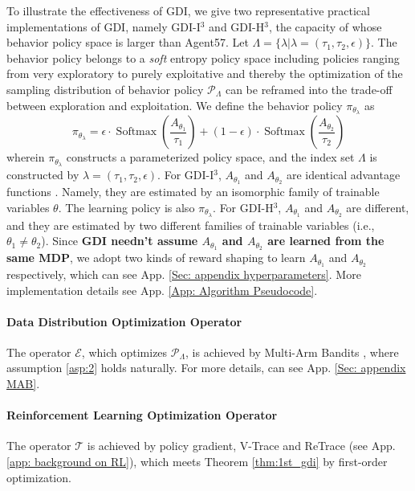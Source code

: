 To illustrate the effectiveness of GDI, we give two representative practical implementations of GDI, namely GDI-I$^3$ and GDI-H$^3$, the capacity of whose behavior policy space is larger than Agent57.  Let $\Lambda = \{\lambda | \lambda = (\tau_1, \tau_2, \epsilon)\}$.
The behavior policy belongs to a \emph{soft} entropy policy space including policies ranging from very exploratory to purely exploitative and thereby the optimization of the sampling distribution  of behavior policy $\mathcal{P}_{\Lambda}$ can be reframed into the trade-off between exploration and exploitation.
We define the behavior policy $\pi_{\theta_{\lambda}}$ as
\begin{equation}
\label{equ: soft epsilon policy space}
    \pi_{\theta_{\lambda}}=\epsilon \cdot \operatorname{Softmax}\left(\frac{A_{\theta_1}}{\tau_{1}}\right)+(1-\epsilon) \cdot \operatorname{Softmax}\left(\frac{A_{\theta_2}}{\tau_{2}}\right)
\end{equation}
wherein $\pi_{\theta_{\lambda}}$ constructs a parameterized policy space, and the index set $\Lambda$ is constructed by $\lambda = (\tau_1, \tau_2, \epsilon)$.
For GDI-I$^3$, $A_{\theta_1}$ and $A_{\theta_2}$ are identical advantage functions \citep{dueling_q}. Namely, they are estimated by an isomorphic family of trainable variables $\theta$.
The learning policy is also $\pi_{\theta_{\lambda}}$.
For GDI-H$^3$,  $A_{\theta_1}$ and $A_{\theta_2}$ are different, and they are estimated by two different families of trainable variables (i.e., $\theta_1 \neq \theta_2$).
Since \textbf{GDI needn't assume $A_{\theta_1}$ and $A_{\theta_2}$ are learned from the same MDP}, we adopt two kinds of reward shaping to learn $A_{\theta_1}$ and $A_{\theta_2}$ respectively, which  can see App. \ref{Sec: appendix hyperparameters}.
More implementation details see App. \ref{App: Algorithm Pseudocode}.

\paragraph{Data Distribution Optimization Operator} The operator $\mathcal{E}$, which optimizes $\mathcal{P}_{\Lambda}$,  is achieved by Multi-Arm Bandits \citep[MAB]{sutton}, 
where assumption \eqref{asp:2} holds naturally.
For more details, can see App. \ref{Sec: appendix MAB}. 


\paragraph{Reinforcement Learning  Optimization Operator}  The operator $\mathcal{T}$ is achieved by policy gradient, V-Trace and ReTrace \citep{impala, retrace} (see App. \ref{app: background on RL}), which meets Theorem \ref{thm:1st_gdi} by first-order optimization. 

